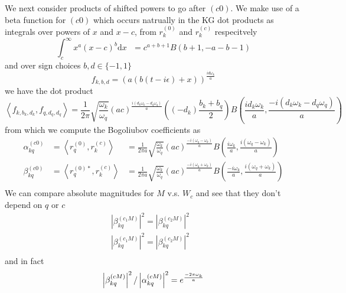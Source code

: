 \documentclass[12pt,a4paper]{article}
\newcommand{\dv}[1]{\mathrm{d} #1 \text{ }}
\begin{document}
We next consider products of shifted powers to go after $(c0)$. We make use of a beta function for $(c0)$ which occurs natrually in the KG dot products as integrals over powers of $x$ and $x-c$, from $r_k^{(0)}$ and $r_k^{(c)}$ respecitvely
\begin{equation}
  \int_{c}^\infty x^a (x-c)^b \dv{x} = c^{a+b+1} B(b+1, -a-b-1)
\end{equation}
and over sign choices $b,d \in \{-1,1\}$
\begin{equation}
  f_{k,b,d} = \left(a\left(b(t-i\epsilon)+x\right)\right)^\frac{id\omega_k}{a}
\end{equation}
we have the dot product
\begin{equation}
  \left< f_{k,b_k,d_k}, f_{q,d_q,d_q}\right> = \frac{1}{2\pi} \sqrt{\frac{\omega_k}{\omega_q}} (ac)^\frac{i(d_k\omega_k - d_q \omega_q)}{a} \left((-d_k)\frac{b_k + b_q}{2} \right) B\left(\frac{id_k\omega_k}{a}, \frac{-i(d_k\omega_k - d_q \omega_q)}{a}\right)
\end{equation}
from which we compute the Bogoliubov coefficients as
\begin{equation}
  \begin{array}{ccl}
    \alpha^{(c0)}_{kq} &= \left<r_q^{(0)}, r_k^{(c)} \right> &= \frac{1}{2 \pi a}\sqrt{\frac{\omega_k}{\omega_q}} (ac)^{\frac{-i(\omega_q - \omega_k)}{a}} B\left(\frac{i\omega_k}{a}, \frac{i(\omega_q - \omega_k)}{a}\right) \\
    \beta^{(c0)}_{kq} &= \left<r_q^{(0)*}, r_k^{(c)} \right> &= \frac{1}{2 \pi a}\sqrt{\frac{\omega_k}{\omega_q}} (ac)^{\frac{-i(\omega_q + \omega_k)}{a}} B\left(\frac{-i\omega_k}{a}, \frac{i(\omega_q + \omega_k)}{a}\right) \\
  \end{array}
  \label{bogo2}
\end{equation}
We can compare absolute magnitudes for $M$ v.s. $W_c$ and see that they don't depend on $q$ or $c$
\begin{equation}
  \begin{array}{cc}
    \left|\beta_{kq}^{(c_1M)}\right|^2 = \left|\beta_{kq}^{(c_2M)}\right|^2 & \\
    \left|\beta_{kq}^{(c_1M)}\right|^2 = \left|\beta_{kq}^{(c_2M)}\right|^2 & \\
 \end{array}
\end{equation}
and in fact
\begin{equation}
    \left|\beta_{kq}^{(cM)}\right|^2 / \left|\alpha_{kq}^{(cM)}\right|^2 = e^{\frac{-2\pi\omega_k}{a}} \\
\end{equation}
\end{document}
